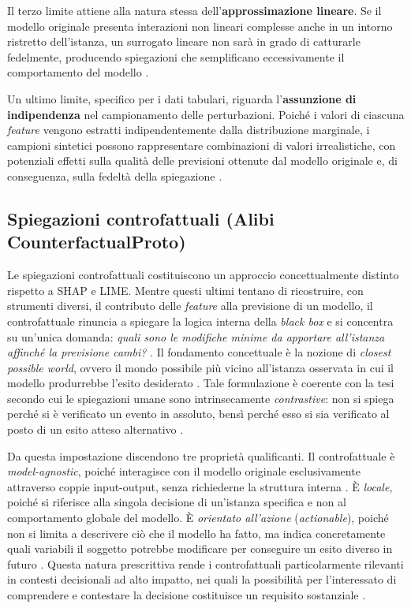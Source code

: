 Il terzo limite attiene alla natura stessa dell'\textbf{approssimazione lineare}. Se il modello originale presenta interazioni non lineari complesse anche in un intorno ristretto dell'istanza, un surrogato lineare non sarà in grado di catturarle fedelmente, producendo spiegazioni che semplificano eccessivamente il comportamento del modello \cite{molnar2025interpretable}.

Un ultimo limite, specifico per i dati tabulari, riguarda l'\textbf{assunzione di indipendenza} nel campionamento delle perturbazioni. Poiché i valori di ciascuna \textit{feature} vengono estratti indipendentemente dalla distribuzione marginale, i campioni sintetici possono rappresentare combinazioni di valori irrealistiche, con potenziali effetti sulla qualità delle previsioni ottenute dal modello originale e, di conseguenza, sulla fedeltà della spiegazione \cite{molnar2025interpretable}.

\subsection{Spiegazioni controfattuali (Alibi CounterfactualProto)}

Le spiegazioni controfattuali costituiscono un approccio concettualmente distinto rispetto a SHAP e LIME. Mentre questi ultimi tentano di ricostruire, con strumenti diversi, il contributo delle \textit{feature} alla previsione di un modello, il controfattuale rinuncia a spiegare la logica interna della \textit{black box} e si concentra su un'unica domanda: \textit{quali sono le modifiche minime da apportare all'istanza affinché la previsione cambi?} \cite{wachter2017counterfactual}. Il fondamento concettuale è la nozione di \textit{closest possible world}, ovvero il mondo possibile più vicino all'istanza osservata in cui il modello produrrebbe l'esito desiderato \cite{wachter2017counterfactual}. Tale formulazione è coerente con la tesi secondo cui le spiegazioni umane sono intrinsecamente \textit{contrastive}: non si spiega perché si è verificato un evento in assoluto, bensì perché esso si sia verificato al posto di un esito atteso alternativo \cite{miller2019explanation}.

Da questa impostazione discendono tre proprietà qualificanti. Il controfattuale è \textit{model-agnostic}, poiché interagisce con il modello originale esclusivamente attraverso coppie input-output, senza richiederne la struttura interna \cite{wachter2017counterfactual}. È \textit{locale}, poiché si riferisce alla singola decisione di un'istanza specifica e non al comportamento globale del modello. È \textit{orientato all'azione} (\textit{actionable}), poiché non si limita a descrivere ciò che il modello ha fatto, ma indica concretamente quali variabili il soggetto potrebbe modificare per conseguire un esito diverso in futuro \cite{wachter2017counterfactual}. Questa natura prescrittiva rende i controfattuali particolarmente rilevanti in contesti decisionali ad alto impatto, nei quali la possibilità per l'interessato di comprendere e contestare la decisione costituisce un requisito sostanziale \cite{wachter2017counterfactual}.


